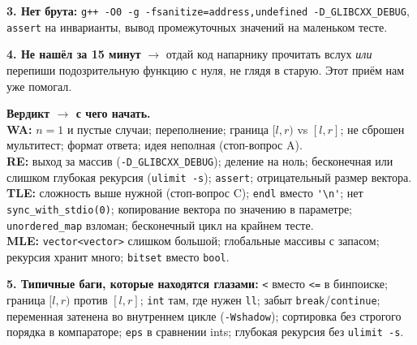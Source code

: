\par \textbf{3. Нет брута:} \texttt{g++ -O0 -g -fsanitize=address,undefined -D\_GLIBCXX\_DEBUG}, \texttt{assert} на инварианты, вывод промежуточных значений на маленьком тесте.
\par \textbf{4. Не нашёл за 15 минут} $\to$ отдай код напарнику прочитать вслух \emph{или} перепиши подозрительную функцию с нуля, не глядя в старую. Этот приём нам уже помогал.
\par \textbf{Вердикт $\to$ с чего начать.}\\
\textbf{WA:} $n=1$ и пустые случаи; переполнение; граница $[l,r)$ vs $[l,r]$; не сброшен мультитест; формат ответа; идея неполная (стоп-вопрос A).\\
\textbf{RE:} выход за массив (\texttt{-D\_GLIBCXX\_DEBUG}); деление на ноль; бесконечная или слишком глубокая рекурсия (\texttt{ulimit -s}); \texttt{assert}; отрицательный размер вектора.\\
\textbf{TLE:} сложность выше нужной (стоп-вопрос C); \texttt{endl} вместо \verb|'\n'|; нет \texttt{sync\_with\_stdio(0)}; копирование вектора по значению в параметре; \texttt{unordered\_map} взломан; бесконечный цикл на крайнем тесте.\\
\textbf{MLE:} \texttt{vector<vector>} слишком большой; глобальные массивы с запасом; рекурсия хранит много; \texttt{bitset} вместо \texttt{bool}.
\par \textbf{5. Типичные баги, которые находятся глазами:} \texttt{<} вместо \texttt{<=} в бинпоиске; граница $[l,r)$ против $[l,r]$; \texttt{int} там, где нужен \texttt{ll}; забыт \texttt{break}/\texttt{continue}; переменная затенена во внутреннем цикле (\texttt{-Wshadow}); сортировка без строгого порядка в компараторе; \texttt{eps} в сравнении ints; глубокая рекурсия без \texttt{ulimit -s}.
